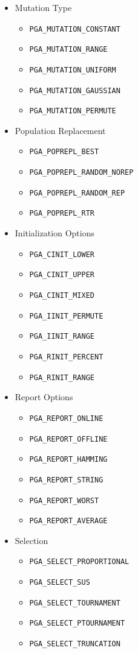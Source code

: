\documentclass{report}
\begin{document}
\begin{itemize}
\item Mutation Type
\begin{itemize}
\item {\tt PGA\_MUTATION\_CONSTANT}
\item {\tt PGA\_MUTATION\_RANGE}
\item {\tt PGA\_MUTATION\_UNIFORM}
\item {\tt PGA\_MUTATION\_GAUSSIAN}
\item {\tt PGA\_MUTATION\_PERMUTE}
\end{itemize}
    
\item Population Replacement
\begin{itemize}
\item \verb+PGA_POPREPL_BEST+
\item \verb+PGA_POPREPL_RANDOM_NOREP+
\item \verb+PGA_POPREPL_RANDOM_REP+
\item \verb+PGA_POPREPL_RTR+
\end{itemize}

\item Initialization Options
\begin{itemize}
\item {\tt PGA\_CINIT\_LOWER}
\item {\tt PGA\_CINIT\_UPPER}
\item {\tt PGA\_CINIT\_MIXED}
\item {\tt PGA\_IINIT\_PERMUTE}
\item {\tt PGA\_IINIT\_RANGE}
\item {\tt PGA\_RINIT\_PERCENT}
\item {\tt PGA\_RINIT\_RANGE}
\end{itemize}

\item Report Options
\begin{itemize}
\item {\tt PGA\_REPORT\_ONLINE}
\item {\tt PGA\_REPORT\_OFFLINE}
\item {\tt PGA\_REPORT\_HAMMING}
\item {\tt PGA\_REPORT\_STRING}
\item {\tt PGA\_REPORT\_WORST}
\item {\tt PGA\_REPORT\_AVERAGE}
\end{itemize}

\item Selection
\begin{itemize}
\item \verb+PGA_SELECT_PROPORTIONAL+
\item \verb+PGA_SELECT_SUS+
\item \verb+PGA_SELECT_TOURNAMENT+
\item \verb+PGA_SELECT_PTOURNAMENT+
\item \verb+PGA_SELECT_TRUNCATION+
\end{itemize}


\end{itemize}
\end{document}
